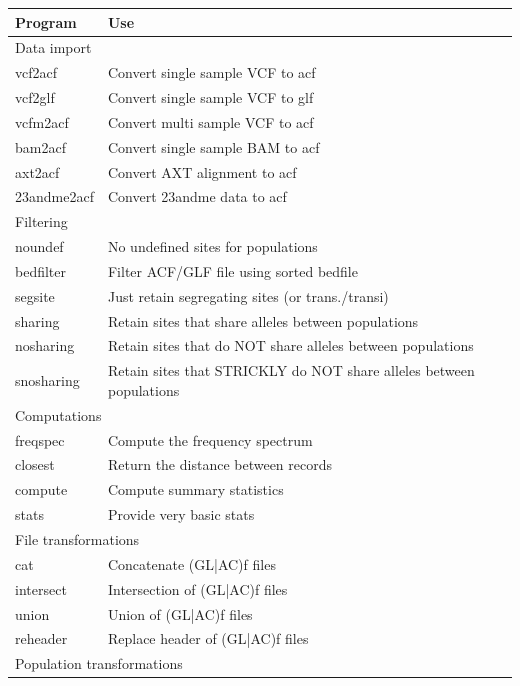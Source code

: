 \documentclass[a4paper]{article}
\begin{document}
\noindent \begin{tabular}{|l|l|}
\hline
Program & Use \\
\hline
\multicolumn{2}{|l|}{Data import} \\
\hline
      vcf2acf     &    Convert single sample VCF to acf  \\
      vcf2glf     &    Convert single sample VCF to glf  \\
      vcfm2acf    &    Convert multi  sample VCF to acf  \\
      bam2acf     &    Convert single sample BAM to acf  \\
      axt2acf     &    Convert AXT alignment to acf  \\
      23andme2acf &    Convert 23andme data to acf  \\
\hline
\multicolumn{2}{|l|}{Filtering} \\
\hline
      noundef     &    No undefined sites for populations \\
      bedfilter   &    Filter ACF/GLF file using sorted bedfile \\
      segsite     &    Just retain segregating sites (or trans./transi) \\
      sharing     &    Retain sites that share alleles between populations \\
      nosharing   &    Retain sites that do NOT share alleles between populations \\
      snosharing  &    Retain sites that STRICKLY do NOT share alleles between populations \\
\hline
\multicolumn{2}{|l|}{Computations} \\
\hline
      freqspec    &    Compute the frequency spectrum \\
      closest     &    Return the distance between records \\
      compute     &    Compute summary statistics \\
      stats       &    Provide very basic stats \\
\hline
\multicolumn{2}{|l|}{File transformations} \\
\hline
      cat         &    Concatenate (GL|AC)f files \\
      intersect   &    Intersection of (GL|AC)f files \\
      union       &    Union of (GL|AC)f files \\
      reheader    &    Replace header of (GL|AC)f files \\
\hline
\multicolumn{2}{|l|}{Population transformations} \\

\end{tabular}
\end{document}
